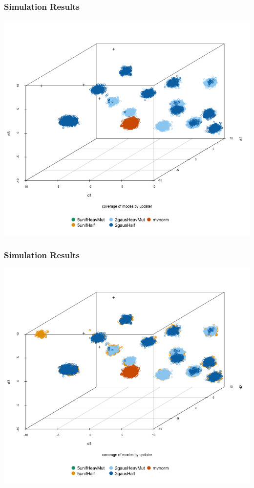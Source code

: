 \documentclass{beamer}\usepackage[]{graphicx}\usepackage[]{color}
\begin{document}
\begin{frame}
  \frametitle{Simulation Results}
  \vspace{-.6in}
  \begin{center}
      \includegraphics[scale=0.35]{figure/final_plot3.png}
  \end{center}
\end{frame}
\begin{frame}
  \frametitle{Simulation Results}
  \vspace{-.6in}
  \begin{center}
      \includegraphics[scale=0.35]{figure/final_plot4.png}
  \end{center}
\end{frame}
\end{document}
